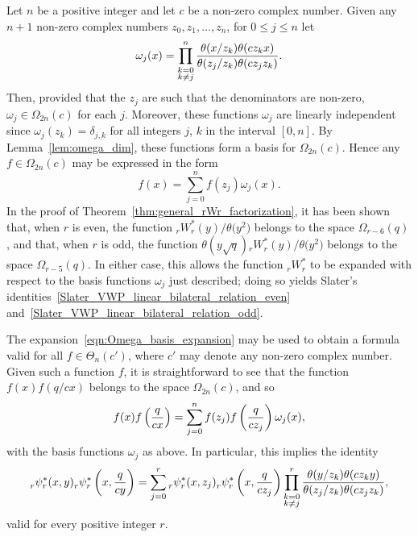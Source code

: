 \documentclass[10pt,a4paper]{amsart}
\numberwithin{equation}{section}
\begin{document}
\begin{Remark} \label{rmk:Slater_VWP_linear_bilateral_relations}
Let $n$ be a positive integer and let $c$ be a non-zero complex number. Given any~${n+1}$ non-zero complex numbers $z_0, z_1,\dots, z_n$, for $0 \leq j \leq n$ let
\[ \omega_j(x) = \prod_{\substack{k=0 \\ k \neq j}}^n {\theta(x/z_k) \theta(cz_kx) \over \theta(z_j/z_k) \theta(cz_jz_k)}. \]
Then, provided that the $z_j$ are such that the denominators are non-zero, $\omega_j \in \Omega_{2n}(c)$ for each $j$. Moreover, these functions $\omega_j$ are linearly independent since $\omega_j(z_k) = \delta_{j,k}$ for all integers $j$, $k$ in the interval $[0,n]$. By Lemma~\ref{lem:omega_dim}, these functions form a basis for $\Omega_{2n}(c)$. Hence any $f \in \Omega_{2n}(c)$ may be expressed in the form
\begin{equation} \label{eqn:Omega_basis_expansion}
f(x) = \sum_{j=0}^n f(z_j) \omega_j(x).
\end{equation}
In the proof of Theorem~\ref{thm:general_rWr_factorization}, it has been shown that, when $r$ is even, the function $_r^{}W_r^\ast(y)/\theta\bigl(y^2\bigr)$ belongs to the space $\Omega_{r-6}(q)$, and that, when $r$ is odd, the function $\theta(y\sqrt{q}){}_r^{}W_r^\ast(y)/\theta\bigl(y^2\bigr)$ belongs to the space $\Omega_{r-5}(q)$. In either case, this allows the function $_r^{}W_r^\ast$ to be expanded with respect to the basis functions $\omega_j$ just described; doing so yields Slater's identities~\eqref{Slater_VWP_linear_bilateral_relation_even} and~\eqref{Slater_VWP_linear_bilateral_relation_odd}.

The expansion~\eqref{eqn:Omega_basis_expansion} may be used to obtain a formula valid for all $f \in \Theta_n(c')$, where $c'$ may denote any non-zero complex number. Given such a function $f$, it is straightforward to see that the function $f(x)f(q/cx)$ belongs to the space $\Omega_{2n}(c)$, and so
\[ f(x)f\left({q \over cx}\right) = \sum_{j=0}^n f(z_j)f\left({q \over cz_j}\right) \omega_j(x), \]
with the basis functions $\omega_j$ as above. In particular, this implies the identity
\[ {}_r^{}\psi_r^\ast(x,y) {}_r^{}\psi_r^\ast\left(x,{q \over cy}\right) = \sum_{j=0}^r {}_r^{}\psi_r^\ast(x,z_j) {}_r^{}\psi_r^\ast\left(x,{q \over cz_j}\right) \prod_{\substack{k=0 \\ k \neq j}}^r {\theta(y/z_k) \theta(cz_ky) \over \theta(z_j/z_k) \theta(cz_jz_k)}, \]
valid for every positive integer $r$.
\end{Remark}
\end{document}
